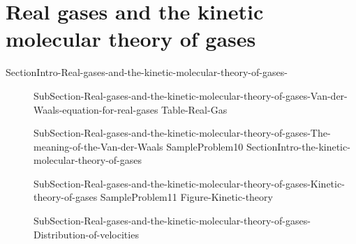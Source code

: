 \documentclass[main.tex]{subfiles}
\newcommand\chapterlabel{Ch-Gas}\setcounter{figurenewcounter}{0}\setcounter{tablenewcounter}{0}\setcounter{formulanewcounter}{0}
\begin{document}
 \section{Real gases and the kinetic molecular theory of gases }
{SectionIntro-Real-gases-and-the-kinetic-molecular-theory-of-gases-}
\sloppy 
\begin{description}
 \item[] {SubSection-Real-gases-and-the-kinetic-molecular-theory-of-gases-Van-der-Waals-equation-for-real-gases}
{Table-Real-Gas}		
\item[]  {SubSection-Real-gases-and-the-kinetic-molecular-theory-of-gases-The-meaning-of-the-Van-der-Waals}
{SampleProblem10}
{SectionIntro-the-kinetic-molecular-theory-of-gases}
 \item[] 
{SubSection-Real-gases-and-the-kinetic-molecular-theory-of-gases-Kinetic-theory-of-gases}
{SampleProblem11}
 {Figure-Kinetic-theory}
 \item[] {SubSection-Real-gases-and-the-kinetic-molecular-theory-of-gases-Distribution-of-velocities}
\end{description}

\clearpage\thispagestyle{empty}\mbox{}\clearpage
\end{document}
